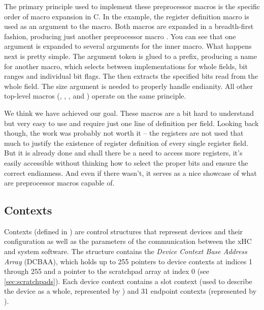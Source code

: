 The primary principle used to implement these preprocessor macros is the
specific order of macro expansion in C. In the example, the register definition
macro is used as an argument to the  macro. Both macros are
expanded in a breadth-first fashion, producing just another preprocessor macro
. You can see
that one argument is expanded to several arguments for the inner macro. What
happens next is pretty simple. The  argument token is glued to
a prefix, producing a name for another macro, which selects between
implementations for whole fields, bit ranges and individual bit flags. The
 then extracts the specified bits read from the whole
field. The size argument is needed to properly handle endianity. All other
top-level macros (, ,
,  and ) operate
on the same principle.

We think we have achieved our goal. These macros are a bit hard to understand but
very easy to use and require just one line of definition per field. Looking
back though, the work was probably not worth it -- the registers are not used
that much to justify the existence of register definition of every single register
field. But it is already done and shall there be a need to access more registers,
it's easily accessible without thinking how to select the proper bits and
ensure the correct endianness. And even if there wasn't, it serves as a nice
showcase of what are preprocessor macros capable of.

\subsection{Contexts}

Contexts (defined in )
are control structures that represent devices and their configuration as well
as the parameters of the communication between the xHC and system software. The
 structure contains the \textit{Device Context Base Address Array} (DCBAA), which
holds up to 255 pointers to device contexts at indices 1 through 255 and a pointer to
the scratchpad array at index 0 (see \ref{sec:scratchpads}). Each device context contains a slot
context (used to describe the device as a whole, represented by ) and
31 endpoint contexts (represented by ).


